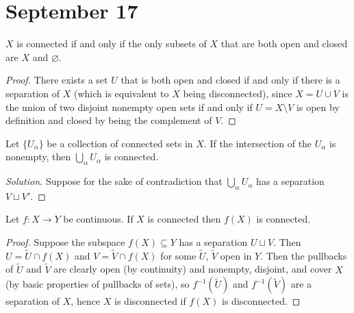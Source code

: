 \documentclass[11pt]{scrartcl}
\providecommand{\inv}{^{-1}}
\renewcommand{\tilde}{\widetilde}
\newenvironment{soln}{\begin{proof}[Solution]}{\end{proof}}
\begin{document}

\section{September 17}\label{sec:sep17}

\begin{prop}
    \label{prop:connected-iff-no-clopen}
    $X$ is connected if and only if the only subsets of $X$
    that are both open and closed are $X$ and $\varnothing$.
\end{prop}

\begin{proof}
    There exists a set $U$ that is both open and closed
    if and only if there is a separation of $X$
    (which is equivalent to $X$ being disconnected),
    since $X = U\cup V$ is the union of two disjoint nonempty open sets
    if and only if $U = X\setminus V$ is open by definition
    and closed by being the complement of $V$.
\end{proof}

\begin{theorem}
    \label{thm:union-connected-sets}
    Let $\{U_\alpha\}$ be a collection of connected sets in $X$.
    If the intersection of the $U_\alpha$ is nonempty, then
    $\bigcup_\alpha U_\alpha$ is connected.
\end{theorem}

\begin{soln}
    Suppose for the sake of contradiction that $\bigcup_\alpha U_\alpha$
    has a separation $V\sqcup V'$.

\end{soln}

\begin{theorem}[$f(\text{connected}) = \text{connected})$]
    \label{thm:connected-pass-thru-cts}
    Let $f\colon X\to Y$ be continuous.
    If $X$ is connected then $f(X)$ is connected.
\end{theorem}

\begin{proof}
    Suppose the subspace $f(X)\subseteq Y$ has a separation $U\sqcup V$.
    Then $U = \tilde U \cap f(X)$ and $V = \tilde V\cap f(X)$
    for some $\tilde U$, $\tilde V$ open in $Y$.
    Then the pullbacks of $\tilde U$ and $\tilde V$ are
    clearly open (by continuity) and nonempty, disjoint, and cover $X$
    (by basic properties of pullbacks of sets),
    so $f\inv(\tilde U)$ and $f\inv(\tilde V)$ are a separation of $X$,
    hence $X$ is disconnected if $f(X)$ is disconnected.
\end{proof}
\end{document}
